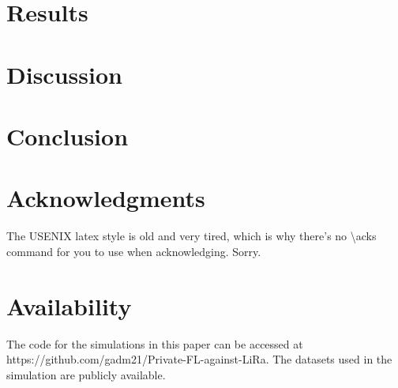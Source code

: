 \section{Results}
\label{sec:results}

\section{Discussion}
\label{sec:discussion}

\section{Conclusion}
\label{sec:conclusion}

\section*{Acknowledgments}


The USENIX latex style is old and very tired, which is why
there's no \textbackslash{}acks command for you to use when
acknowledging. Sorry.

\section*{Availability}

The code for the simulations in this paper can be accessed at https://github.com/gadm21/Private-FL-against-LiRa. The datasets used in the simulation are publicly available. 








